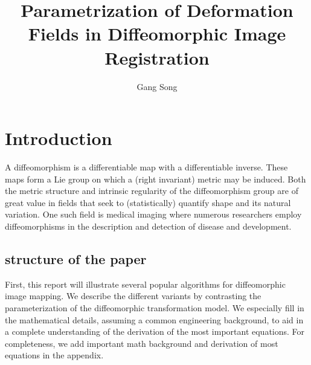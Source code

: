 \documentclass[letterpaper,12pt]{article}
\title{Parametrization of Deformation Fields in Diffeomorphic Image Registration}
\author{Gang Song}
\date{}
\begin{document}
\maketitle
\begin{abstract}
\end{abstract}



\section{Introduction}
\label{sec:intro}
A diffeomorphism is a differentiable map with a differentiable
inverse.  These maps form a Lie group on which a (right invariant)
metric may be induced.  Both the metric structure and intrinsic
regularity of the diffeomorphism group are of great value in fields
that seek to (statistically) quantify shape and its natural variation.
One such field is medical imaging where numerous researchers employ
diffeomorphisms in the description and detection of disease and
development.  







\subsection{structure of the paper}

First, this report will illustrate several popular algorithms for
diffeomorphic image mapping. We describe the different variants by
contrasting the parameterization of the diffeomorphic transformation
model. We especially fill in the mathematical details, assuming a
common engineering background, to aid in a complete understanding of
the derivation of the most important equations. For completeness, we
add important math background and derivation of most equations in the appendix. 
\end{document}

